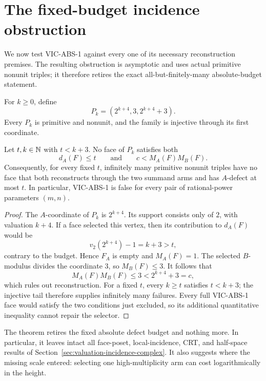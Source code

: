 \section{The fixed-budget incidence obstruction}\label{sec:vic-fixed-budget-obstruction}

We now test VIC-ABS-1 against every one of its necessary reconstruction
premises.  The resulting obstruction is asymptotic and uses actual primitive
nonunit triples; it therefore retires the exact all-but-finitely-many
absolute-budget statement.

For $k\ge0$, define
\[
 P_k=(2^{k+4},3,2^{k+4}+3).
\]
Every $P_k$ is primitive and nonunit, and the family is injective through its
first coordinate.

\begin{theorem}
\label{thm:vic-fixed-budget-obstruction}
Let $t,k\in\mathbb N$ with $t<k+3$.  No face of $P_k$ satisfies both
\[
 d_A(F)\le t
 \qquad\text{and}\qquad
 c<M_A(F)M_B(F).
\]
Consequently, for every fixed $t$, infinitely many primitive nonunit triples
have no face that both reconstructs through the two summand arms and has
$A$-defect at most $t$.  In particular, VIC-ABS-1 is false for every pair of
rational-power parameters $(m,n)$.
\end{theorem}

\begin{proof}
The $A$-coordinate of $P_k$ is $2^{k+4}$.  Its support consists only of $2$,
with valuation $k+4$.  If a face selected this vertex, then its contribution
to $d_A(F)$ would be
\[
 v_2(2^{k+4})-1=k+3>t,
\]
contrary to the budget.  Hence $F_A$ is empty and $M_A(F)=1$.
The selected $B$-modulus divides the coordinate $3$, so $M_B(F)\le3$.
It follows that
\[
 M_A(F)M_B(F)\le3<2^{k+4}+3=c,
\]
which rules out reconstruction.  For a fixed $t$, every $k\ge t$ satisfies
$t<k+3$; the injective tail therefore supplies infinitely many failures.
Every full VIC-ABS-1 face would satisfy the two conditions just excluded, so
its additional quantitative inequality cannot repair the selector.
\end{proof}

The theorem retires the fixed absolute defect budget and nothing more.  In
particular, it leaves intact all face-poset, local-incidence, CRT, and
half-space results of Section~\ref{sec:valuation-incidence-complex}.  It also
suggests where the missing scale entered: selecting one high-multiplicity arm
can cost logarithmically in the height.

